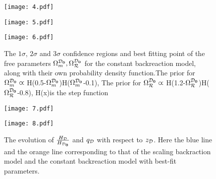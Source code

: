 \documentclass[preprint,preprintnumbers, prd, floatfix,  superscriptaddress,nofootinbib] {revtex4-1}
\newcommand{\CD}{{\cal D}}
\newcommand{\CR}{{\cal R}}
\newcommand{\now}[1]{{#1_{\rm \bf 0}}}
\begin{document}
\begin{figure}
\begin{flushleft}
\begin{minipage}{0.45\linewidth}
  \centerline{\texttt{[image: 4.pdf]}}
\end{minipage}
\hfill
\end{flushleft}

\begin{flushleft}
\begin{minipage}{0.46\linewidth}
  \centerline{\texttt{[image: 5.pdf]}}
\end{minipage}
\hfill
\begin{minipage}{0.45\linewidth}
 \centerline{\texttt{[image: 6.pdf]}}
\end{minipage}
\end{flushleft}

\caption{The $1\sigma$, $2\sigma$ and $3\sigma$ confidence regions and best fitting point of the free parameters $\Omega_{m}^{\now\CD},\Omega_{\CR}^{\now\CD}$ for the
 constant backreaction model, along with their own probability density function.The prior for $\Omega_{m}^{\now\CD}\varpropto $ H(0.5-$\Omega_{m}^{\now\CD}$)H($\Omega_{m}^{\now\CD}$-0.1),
The prior for $\Omega_{\CR}^{\now\CD}\varpropto$ H(1.2-$\Omega_{\CR}^{\now\CD}$)H($\Omega_{\CR}^{\now\CD}$-0.8),
H(x)is the step function}
\label{fig:2}
\end{figure}

\begin{figure}
\begin{minipage}{0.45\linewidth}
  \centerline{\texttt{[image: 7.pdf]}}
\end{minipage}
\hfill
\begin{minipage}{0.45\linewidth}
  \centerline{\texttt{[image: 8.pdf]}}
\end{minipage}

\caption{The evolution of $\frac{H_{\CD}}{H_{\now\CD}}$  and  $q_{\CD}$ with respect to $z_{\CD}$. Here the blue line and the orange line corresponding to that of the scaling backraction model and the constant backreaction model with best-fit parameters. }
\label{fig:3}
\end{figure}
\end{document}
